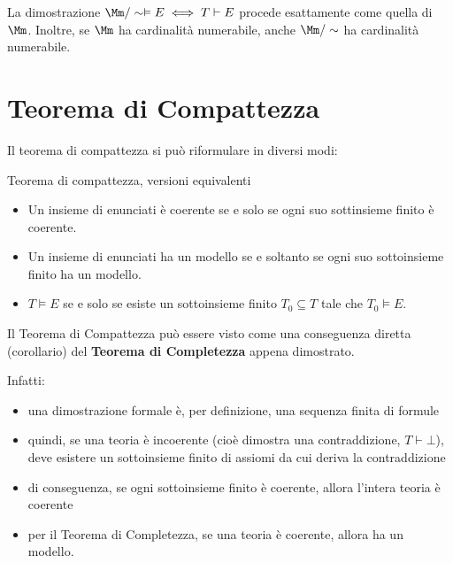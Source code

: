 \documentclass[a4paper,11pt]{report}
\begin{document}
La dimostrazione \( \Mm/\sim \vDash E \iff T\vdash E \) procede esattamente come quella di \( \Mm \). Inoltre, se \( \Mm \) ha cardinalità numerabile, anche \( \Mm/\sim \) ha cardinalità numerabile.

\newpage
\section{Teorema di Compattezza}
Il teorema di compattezza si può riformulare in diversi modi:

\begin{thmframe}{Teorema di compattezza, versioni equivalenti}{}

    \begin{itemize}
        \item Un insieme di enunciati è coerente se e solo se ogni suo sottinsieme finito è coerente.

        \item Un insieme di enunciati ha un modello se e soltanto se ogni suo sottoinsieme finito ha un modello.

        \item \( T\vDash E \) se e solo se esiste un sottoinsieme finito \( T_0 \subseteq T \) tale che \( T_0 \vDash E \).
    \end{itemize}
    
\end{thmframe}

\begin{pframe}
   Il Teorema di Compattezza può essere visto come una conseguenza diretta (corollario) del \textbf{Teorema di Completezza} appena dimostrato.

   Infatti:
   \begin{itemize}
        \item una dimostrazione formale è, per definizione, una sequenza finita di formule
        \item quindi, se una teoria è incoerente (cioè dimostra una contraddizione, \( T\vdash\bot \)), deve esistere un sottoinsieme finito di assiomi da cui deriva la contraddizione
        \item di conseguenza, se ogni sottoinsieme finito è coerente, allora l'intera teoria è coerente
        \item per il Teorema di Completezza, se una teoria è coerente, allora ha un modello.
    \end{itemize}
\end{pframe}
\end{document}
